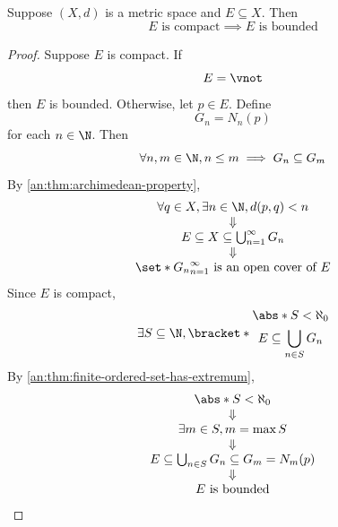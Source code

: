 \bigskip

\begin{theorem} \label{an:thm:compact-set-is-bounded}
  Suppose $(X, d)$ is a metric space and $E \subseteq X$. Then
  \[
    E \text{ is compact} \implies E \text{ is bounded}
  \]
\end{theorem}

\begin{proof}
  Suppose $E$ is compact. If
  \[
    E = \vnot
  \]
  then $E$ is bounded. Otherwise, let $p \in E$. Define
  \[
    G_{n} = N_{n}(p)
  \]
  for each $n \in \N$. Then
  \[
    \forall n, m \in \N, n \leq m \implies G_{n} \subseteq G_{m}
  \]
  By \cref{an:thm:archimedean-property},
  \[
    \begin{array}{c}
      \forall q \in X, \exists n \in \N, d(p, q) < n         \\
      \Downarrow                                             \\
      E \subseteq X \subseteq \bigcup_{n = 1}^{\infty} G_{n} \\
      \Downarrow                                             \\
      \set*{G_{n}}_{n = 1}^{\infty} \text{ is an open cover of } E
    \end{array}
  \]
  Since $E$ is compact,
  \[
    \exists S \subseteq \N,
    \bracket*{\begin{gathered}
        \abs*{S} < \aleph_{0} \\
        E \subseteq \bigcup_{n \in S} G_{n}
      \end{gathered}}
  \]
  By \cref{an:thm:finite-ordered-set-has-extremum},
  \[
    \begin{array}{c}
      \abs*{S} < \aleph_{0}                                          \\
      \Downarrow                                                     \\
      \exists m \in S, m = \max S                                    \\
      \Downarrow                                                     \\
      E \subseteq \bigcup_{n \in S} G_{n} \subseteq G_{m} = N_{m}(p) \\
      \Downarrow                                                     \\
      E \text{ is bounded}
    \end{array}
  \]
\end{proof}

\bigskip

